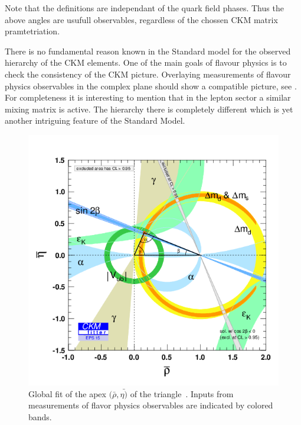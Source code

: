 \noindent Note that the definitions  are independant of
the quark field phases. Thus the above angles are usufull observables, regardless of the chossen
CKM matrix pramtetriation.

There is no fundamental reason known in the Standard model for the observed hierarchy of the CKM elements.
One of the main goals of flavour physics is to check the consistency of the CKM picture.
Overlaying measurements of flavour physics observables in the complex plane should show a compatible
picture, see . For completeness it is interesting to mention that in the lepton
sector a similar mixing matrix is active. The hierarchy there is completely different which is yet another
intriguing feature of the Standard Model.

\begin{figure}[!h]
  \begin{center}
    \includegraphics[trim=0cm 0.5cm 0cm 1.5cm, clip=true, width=\textwidth]{Figures/Chapter1/rhoeta_large.png}
    \caption{Global fit of the apex $(\bar{\rho},\bar{\eta)}$ of the \Bd triangle~\cite{ckm-fitter-phis-pred}.
             Inputs from measurements of flavor physics observables are indicated by colored bands.}
    \label{unitarity_triangle}
  \end{center}
\end{figure}

